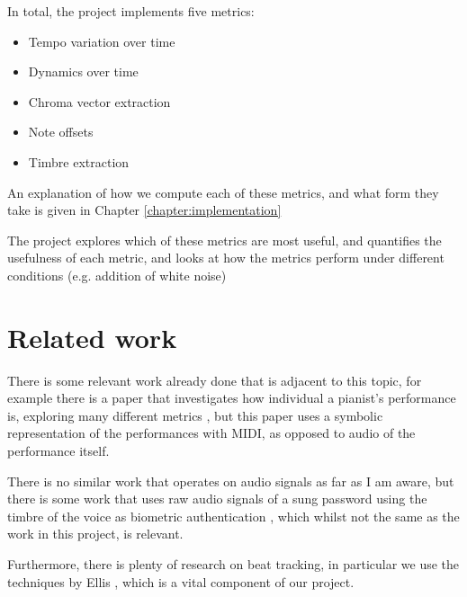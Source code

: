 \documentclass[oneside, class=book, crop=false, 12pt]{standalone}
\begin{document}
In total, the project implements five metrics:

\begin{itemize}
  \item
    Tempo variation over time

  \item
    Dynamics over time

  \item
    Chroma vector extraction

  \item
    Note offsets

  \item
    Timbre extraction
\end{itemize}

An explanation of how we compute each of these metrics, and what form they take is given in Chapter \ref{chapter:implementation}

The project explores which of these metrics are most useful, and quantifies the usefulness of each metric, and looks at how the metrics perform under different conditions (e.g. addition of white noise)


\section{Related work}

There is some relevant work already done that is adjacent to this topic, for example there is a paper that investigates how individual a pianist's performance is, exploring many different metrics \cite{bernays14}, but this paper uses a symbolic representation of the performances with MIDI, as opposed to audio of the performance itself.

There is no similar work that operates on audio signals as far as I am aware, but there is some work that uses raw audio signals of a sung password using the timbre of the voice as biometric authentication \cite{prakash16}, which whilst not the same as the work in this project, is relevant.

Furthermore, there is plenty of research on beat tracking, in particular we use the techniques by Ellis \cite{ellis07}, which is a vital component of our project.

\ifstandalone
  \printbibliography[heading=subbibliography]
\fi
    
\end{document}
